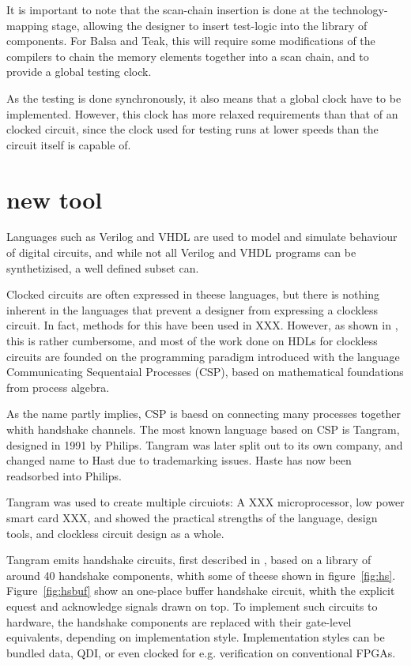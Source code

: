 It is important to note that the scan-chain insertion is done at the
technology-mapping stage, allowing the designer to insert test-logic
into the library of components. For Balsa and Teak, this will require
some modifications of the compilers to chain the memory elements
together into a scan chain, and to provide a global testing clock.

As the testing is done synchronously, it also means that a global
clock have to be implemented. However, this clock has more relaxed
requirements than that of an clocked circuit, since the clock used for
testing runs at lower speeds than the circuit itself is capable of.

\section{new tool}


Languages such as Verilog and VHDL are used to model and simulate
behaviour of digital circuits, and while not all Verilog and VHDL
programs can be synthetizised, a well defined subset can.

Clocked circuits are often expressed in theese languages, but there is
nothing inherent in the languages that prevent a designer from
expressing a clockless circuit. In fact, methods for this have been
used in XXX. However, as shown in \cite[pp XXX]{sparso}, this is
rather cumbersome, and most of the work done on HDLs for clockless
circuits are founded on the programming paradigm introduced with the
language Communicating Sequentaial Processes (CSP)\cite{xxx}, based on
mathematical foundations from process algebra.

As the name partly implies, CSP is baesd on connecting many processes
together whith handshake channels. The most known language based on
CSP is Tangram, designed in 1991 by Philips. Tangram was later split
out to its own company, and changed name to Hast due to trademarking
issues. Haste has now been readsorbed into Philips.

Tangram was used to create multiple circuiots: A XXX microprocessor,
low power smart card XXX, and showed the practical strengths of the
language, design tools,  and clockless circuit design as a
whole.

Tangram emits handshake circuits, first described in
\cite{12,teakxxx}, based on a library of around 40 handshake
components, whith some of theese shown in
figure~\ref{fig:hs}. Figure~\ref{fig:hsbuf} show an one-place buffer
handshake circuit, whith the explicit equest and acknowledge signals
drawn on top. To implement such circuits to hardware, the handshake
components are replaced with their gate-level equivalents, depending
on implementation style. Implementation styles can be bundled data,
QDI, or even clocked for e.g. verification on conventional FPGAs.

